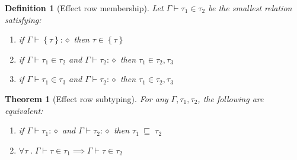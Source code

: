 \documentclass[12pt]{article}
\newtheorem{definition}{Definition}
\newtheorem{theorem}{Theorem}
\newcommand\anno[2]{#1 : #2}
\newcommand\type{\tau}
\newcommand\tsingleton[1]{\left\{ #1 \right\}}
\newcommand\tunion[2]{#1, #2}
\newcommand\krow{\diamond}
\newcommand\context{\Gamma}
\newcommand\hastype[3]{#1 \vdash \anno{#2}{#3}}
\newcommand\subtype[2]{#1 \; \sqsubseteq \; #2}
\begin{document}
  \begin{definition}[Effect row membership]
    Let $\context \vdash \type_1 \in \type_2$ be the smallest relation satisfying:
    \begin{enumerate}
      \item if $\hastype{\context}{\tsingleton{\type}}{\krow}$ then $\type \in \tsingleton{\type}$
      \item if $\context \vdash \type_1 \in \type_2$ and $\hastype{\context}{\type_2}{\krow}$ then $\type_1 \in \tunion{\type_2}{\type_3}$
      \item if $\context \vdash \type_1 \in \type_3$ and $\hastype{\context}{\type_2}{\krow}$ then $\type_1 \in \tunion{\type_2}{\type_3}$
    \end{enumerate}
  \end{definition}

  \begin{theorem}[Effect row subtyping]
    For any $\context, \type_1, \type_2$, the following are equivalent:
    \begin{enumerate}
      \item if $\hastype{\context}{\type_1}{\krow}$ and $\hastype{\context}{\type_2}{\krow}$ then $\subtype{\type_1}{\type_2}$
      \item $\forall \type \;.\; \context \vdash \type \in \type_1 \implies \context \vdash \type \in \type_2$
    \end{enumerate}
  \end{theorem}
\end{document}
